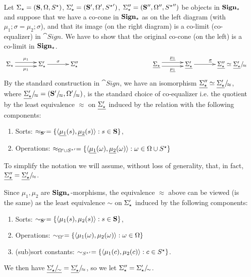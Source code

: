 \begin{PROOF}
Let $\Sigma_\star=({\bf S},\Omega,{S^\star})$,
$\Sigma'_\star=({\bf S}',\Omega',{S^\star}')$,
$\Sigma''_\star=({\bf S}'',\Omega'',{S^\star}'')$ be objects in
${\bf Sign_\star}$ and
suppose that we have a co-cone in ${\bf Sign_\star}$ as on the left diagram
(with $\mu_1;\sigma=\mu_2;\sigma$), 
and that its image (on the right diagram)
is a co-limit (co-equalizer) in $\cat{Sign}$. We have to show that the
original co-cone (on the left) is a co-limit in ${\bf Sign_\star}$.
\[\xymatrix@C=1.2cm{
\Sigma_\cons \ar@<0.7ex>[r]^{\mu_1} \ar@<-0.7ex>[r]_{\mu_1} 
  & \Sigma'_\cons \ar[r]^{\sigma} 
  & \Sigma''_\cons
&&&
\under{\Sigma_\cons} \ar@<0.7ex>[r]^{\under{\mu_1}}
\ar@<-0.7ex>[r]_{\under{\mu_1}} 
  & \under{\Sigma'_\cons} \ar[r]^{\under{\sigma}} 
  & \under{\Sigma''_\cons} \iso \qu{\under{\Sigma'_\cons}}{\approx}
}
\]
By the standard construction in $\cat{Sign}$, we have an isomorphism $\underline{\Sigma''_\star} \mathrel{\simeq}
\underline{\Sigma'_\star}/\!_{\approx}$, where
$\underline{\Sigma'_\star}/\!_{\approx}=({\bf S}'/\!_{\approx},\Omega'/\!_{\approx})$, is the standard choice of
co-equalizer i.e. the quotient by  the least equivalence $\approx$ on
$\underline{\Sigma'_\star}$ induced by the 
relation with the following components:
 \begin{enumerate}\MyLPar
\item Sorts: $\approx_{{\bf S}'}= \{ \langle \underline{\mu_1}(s),\underline{\mu_2}(s)
\rangle: s \in {\bf S} \}$,
\item Operations: $\approx_{\Omega'\cup{S^\star}'}= \{ \langle \underline{\mu_1}(\omega), \underline{\mu_2}(\omega)
\rangle : \omega \in \Omega\cup{S^\star} \}$
\end{enumerate}
To simplify the notation we will assume, without loss of generality, that, in
fact,  $\underline{\Sigma''_\star} = \underline{\Sigma'_\star}/\!_{\approx}$. 

Since $\mu_1,\mu_2$ are ${\bf Sign_\star}$-morphisms, the equivalence
$\approx$ above can be viewed (is the same) as the least equivalence $\sim$ 
on $\Sigma'_\star$ induced by the following components:
 \begin{enumerate}\MyLPar\setcounter{enumi}{2}
\item\label{it:s1} Sorts: $\sim_{{\bf S}'}= \{ \langle \mu_1(s),\mu_2(s)
\rangle: s \in {\bf S} \}$,
\item Operations: $\sim_{\Omega'}= \{ \langle \mu_1(\omega), \mu_2(\omega)
\rangle : \omega \in \Omega \}$
\item\label{it:sub1} (sub)sort constants: $\sim_{{S^\star}'}= \{ \langle 
\mu_1(c), \mu_2(c) \rangle : c \in S^\star \}$.
\end{enumerate}
%
We then have
$\underline{\Sigma'_\star/\!_{\sim}}=\underline{\Sigma'_\star}/\!_{\approx}$, so we
let $\Sigma''_\star=\Sigma'_\star/\!_{\sim}$.


\end{PROOF}
